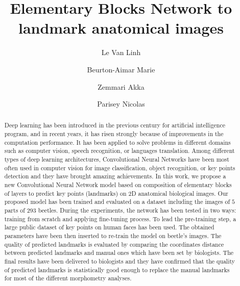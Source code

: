 \documentclass[review]{elsarticle}
\begin{document}
\begin{frontmatter}

\title{Elementary Blocks Network to landmark anatomical images}


\author[labri,itdlu]{Le Van Linh}
\author[labri]{Beurton-Aimar Marie}
\author[labri]{Zemmari Akka}
\author[igepp]{Parisey Nicolas}


\address[labri]{University of Bordeaux, 351, cours de la Liberation, 33405 Talence, France}

\address[igepp]{UMR 1349 IGEPP, BP 35327, 35653 Le Rheu, France}
\address[itdlu]{Dalat University, Dalat, Lam Dong, Vietnam}

\begin{abstract}
Deep learning has been introduced in the previous century for
artificial intelligence program, and in recent years, it has risen
strongly because of improvements in the computation performance. It
has been applied to solve problems in different domains such as
computer vision, speech recognition, or languages translation. Among
different types of deep learning architectures, Convolutional Neural
Networks have been most often used in computer vision for image
classification, object recognition, or key points detection and they
have brought amazing achievements. In this work, we propose a new
Convolutional Neural Network model based on composition of elementary
blocks of layers to predict key points (landmarks) on 2D anatomical
biological images. Our proposed model has been trained and evaluated
on a dataset including the images of $5$ parts of $293$
beetles. During the experiments, the network has been tested in two
ways: training from scratch and applying fine-tuning process. To lead
the pre-training step, a large public dataset of key points on human
faces has been used. The obtained parameters have been then inserted
to re-train the model on beetle's images. The quality of predicted
landmarks is evaluated by comparing the coordinates distance between
predicted landmarks and manual ones which have been set by
biologists. The final results have been delivered to biologists and
they have confirmed that the quality of predicted landmarks is
statistically good enough to replace the manual landmarks for most of
the different morphometry analyses.


\end{abstract}
\end{frontmatter}
\end{document}

